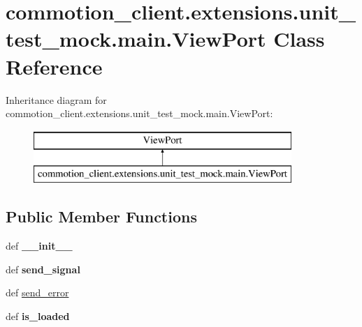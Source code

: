 \hypertarget{classcommotion__client_1_1extensions_1_1unit__test__mock_1_1main_1_1ViewPort}{\section{commotion\-\_\-client.\-extensions.\-unit\-\_\-test\-\_\-mock.\-main.\-View\-Port Class Reference}
\label{classcommotion__client_1_1extensions_1_1unit__test__mock_1_1main_1_1ViewPort}
}
Inheritance diagram for commotion\-\_\-client.\-extensions.\-unit\-\_\-test\-\_\-mock.\-main.\-View\-Port\-:\begin{figure}[H]
\begin{center}
\leavevmode
\includegraphics[height=2.000000cm]{classcommotion__client_1_1extensions_1_1unit__test__mock_1_1main_1_1ViewPort}
\end{center}
\end{figure}
\subsection*{Public Member Functions}
\begin{DoxyCompactItemize}
\item 
\hypertarget{classcommotion__client_1_1extensions_1_1unit__test__mock_1_1main_1_1ViewPort_aee1f7a0c54f76a72ad9161a600173b62}{def {\bfseries \-\_\-\-\_\-init\-\_\-\-\_\-}}\label{classcommotion__client_1_1extensions_1_1unit__test__mock_1_1main_1_1ViewPort_aee1f7a0c54f76a72ad9161a600173b62}

\item 
\hypertarget{classcommotion__client_1_1extensions_1_1unit__test__mock_1_1main_1_1ViewPort_a448314ebfe5a2dd40088ba107598e420}{def {\bfseries send\-\_\-signal}}\label{classcommotion__client_1_1extensions_1_1unit__test__mock_1_1main_1_1ViewPort_a448314ebfe5a2dd40088ba107598e420}

\item 
def \hyperlink{classcommotion__client_1_1extensions_1_1unit__test__mock_1_1main_1_1ViewPort_a2f7a09774f0ed12d8588104e76e04027}{send\-\_\-error}
\item 
\hypertarget{classcommotion__client_1_1extensions_1_1unit__test__mock_1_1main_1_1ViewPort_a4889467cc323053dd9a5c2c018ce2843}{def {\bfseries is\-\_\-loaded}}\label{classcommotion__client_1_1extensions_1_1unit__test__mock_1_1main_1_1ViewPort_a4889467cc323053dd9a5c2c018ce2843}

\end{DoxyCompactItemize}
